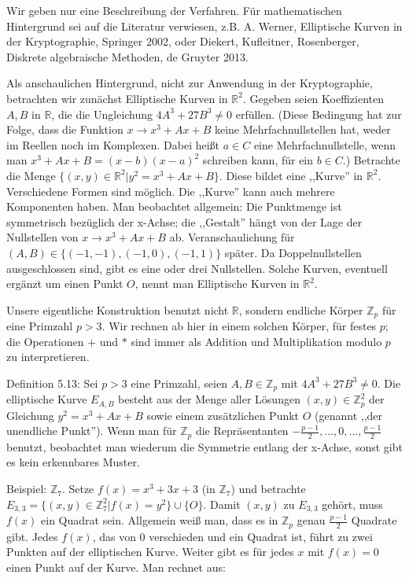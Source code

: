 \documentclass[a4paper]{article}
\begin{document}
\begin{multicols}{3}
{{{{            Wir geben nur eine Beschreibung der Verfahren. Für mathematischen Hintergrund sei auf die Literatur verwiesen, z.B. A. Werner, Elliptische Kurven in der Kryptographie, Springer 2002, oder Diekert, Kufleitner, Rosenberger, Diskrete algebraische Methoden, de Gruyter 2013.

            Als anschaulichen Hintergrund, nicht zur Anwendung in der Kryptographie, betrachten wir zunächst Elliptische Kurven in $\mathbb{R}^2$. Gegeben seien Koeffizienten $A, B$ in $\mathbb{R}$, die die Ungleichung $4A^3+ 27B^3 \not= 0$ erfüllen. (Diese Bedingung hat zur Folge, dass die Funktion $x\rightarrow x^3+Ax+B$ keine Mehrfachnullstellen hat, weder im Reellen noch im Komplexen. Dabei heißt $a\in C$ eine Mehrfachnullstelle, wenn man $x^3+Ax+B= (x-b)(x-a)^2$ schreiben kann, für ein $b\in C$.) Betrachte die Menge $\{(x,y)\in\mathbb{R}^2| y^2=x^3+Ax+B\}$.
            Diese bildet eine ,,Kurve'' in $\mathbb{R}^2$. Verschiedene Formen sind möglich. Die ,,Kurve'' kann auch mehrere Komponenten haben. Man beobachtet allgemein: Die Punktmenge ist symmetrisch bezüglich der x-Achse; die ,,Gestalt'' hängt von der Lage der Nullstellen von $x\rightarrow x^3+Ax+B$ ab. Veranschaulichung für $(A,B)\in\{(- 1 ,-1),(- 1 ,0),(- 1 ,1)\}$ später. Da Doppelnullstellen ausgeschlossen sind, gibt es eine oder drei Nullstellen.
            Solche Kurven, eventuell ergänzt um einen Punkt $O$, nennt man Elliptische Kurven in $\mathbb{R}^2$.

            Unsere eigentliche Konstruktion benutzt nicht $\mathbb{R}$, sondern endliche Körper $\mathbb{Z}_p$ für eine Primzahl $p>3$. Wir rechnen ab hier in einem solchen Körper, für festes $p$; die Operationen $+$ und $*$ sind immer als Addition und Multiplikation modulo $p$ zu interpretieren.

            Definition 5.13: Sei $p >3$ eine Primzahl, seien $A,B\in\mathbb{Z}_p$ mit $4A^3+ 27B^3 \not= 0$. Die elliptische Kurve $E_{A,B}$ besteht aus der Menge aller Lösungen $(x,y)\in\mathbb{Z}^2_p$ der Gleichung $y^2=x^3+Ax+B$ sowie einem zusätzlichen Punkt $O$ (genannt ,,der unendliche Punkt'').
            Wenn man für $\mathbb{Z}_p$ die Repräsentanten $-\frac{p-1}{2},..., 0 , ...,\frac{p-1}{2}$ benutzt, beobachtet man wiederum die Symmetrie entlang der x-Achse, sonst gibt es kein erkennbares Muster.

            Beispiel: $\mathbb{Z}_7$. Setze $f(x)=x^3+ 3x+ 3$ (in $\mathbb{Z}_7$) und betrachte $E_{3,3}=\{(x,y)\in\mathbb{Z}^2_7 | f(x)=y^2\}\cup \{O\}$. Damit $(x,y)$ zu $E_{3,3}$ gehört, muss $f(x)$ ein Quadrat sein. Allgemein weiß man, dass es in $\mathbb{Z}_p$ genau $\frac{p-1}{2}$ Quadrate gibt. Jedes $f(x)$, das von $0$ verschieden und ein Quadrat ist, führt zu zwei Punkten auf der elliptischen Kurve. Weiter gibt es für jedes $x$ mit $f(x) = 0$ einen Punkt auf der Kurve. Man rechnet aus:

}}}}
\end{multicols}
\end{document}
